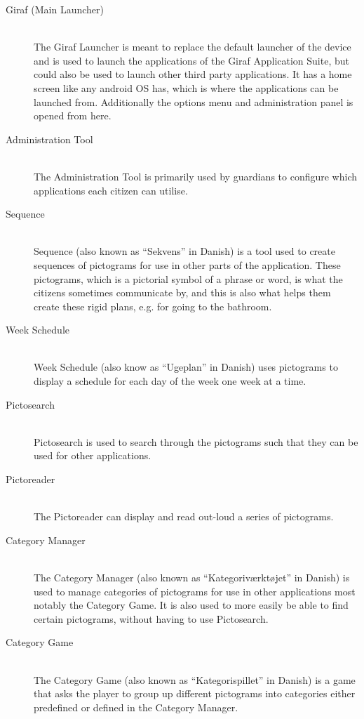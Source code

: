 \begin{description}
	\item[Giraf (Main Launcher)]\hfill \\
	The Giraf Launcher is meant to replace the default launcher of the device and is used to launch the applications of the Giraf Application Suite, but could also be used to launch other third party applications.
	It has a home screen like any android OS has, which is where the applications can be launched from.
	Additionally the options menu and administration panel is opened from here.
	\item[Administration Tool]\hfill \\
	The Administration Tool is primarily used by guardians to configure which applications each citizen can utilise.
	\item[Sequence] \hfill \\
	Sequence (also known as \enquote{Sekvens} in Danish) is a tool used to create sequences of pictograms for use in other parts of the application.
	These pictograms, which is a pictorial symbol of a phrase or word, is what the citizens sometimes communicate by, and this is also what helps them create these rigid plans, e.g. for going to the bathroom.
	\item[Week Schedule] \hfill \\
	Week Schedule (also know as \enquote{Ugeplan} in Danish) uses pictograms to display a schedule for each day of the week one week at a time.
	\item[Pictosearch] \hfill \\
	Pictosearch is used to search through the pictograms such that they can be used for other applications.
	\item[Pictoreader] \hfill \\
	The Pictoreader can display and read out-loud a series of pictograms.
	\item[Category Manager] \hfill \\
	The Category Manager (also known as \enquote{Kategoriværktøjet} in Danish) is used to manage categories of pictograms for use in other applications most notably the Category Game.
	It is also used to more easily be able to find certain pictograms, without having to use Pictosearch.
	\item[Category Game] \hfill \\
	The Category Game (also known as \enquote{Kategorispillet} in Danish) is a game that asks the player to group up different pictograms into categories either predefined or defined in the Category Manager.

\end{description}
